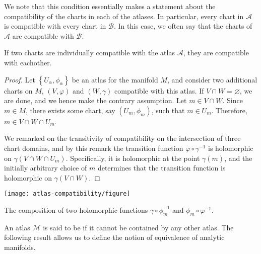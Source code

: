 We note that this condition essentially makes a statement about the
compatibility of the charts in each of the atlases. In particular, every chart
in $ \mathcal{A} $ is compatible with every chart in $ \mathcal{B} $. In this
case, we often say that the charts of $ \mathcal{A} $ are compatible with $
	\mathcal{B} $.

\begin{lemma}\label{lem:compatibility-transitivity}
	If two charts are individually compatible with the atlas $ \mathcal{A} $, they
	are compatible with eachother.
	\begin{proof}
		Let $ \left\{ U _{\alpha}, \phi _{\alpha} \right\} $ be an atlas for the
		manifold $ M $, and consider two additional charts on $ M $, $ (V, \varphi) $
		and $ (W, \gamma) $ compatible with this atlas. If $ V \cap W = \varnothing
		$, we are done, and we hence make the contrary assumption. Let $ m \in V
			\cap W $. Since $ m \in M $, there exists some chart, say $ (U_m, \phi_m) $,
		such that $ m \in U_m $. Therefore, $ m \in V \cap W \cap U_m $.

		We remarked on the transitivity of compatibility on the intersection of three
		chart domains, and by this remark the transition function $ \varphi \circ \gamma
			^{-1} $ is holomorphic on $ \gamma(V \cap W \cap U_m) $. Specifically, it is
		holomorphic at the point $ \gamma(m) $, and the initially arbitrary choice of $
			m $ determines that the transition function is holomorphic on $ \gamma(V \cap W)
		$.
	\end{proof}
\end{lemma}

\begin{marginfigure}[-15\baselineskip]
	\centering
	\texttt{[image: atlas-compatibility/figure]}
	\caption{The composition of two holomorphic functions $ \gamma \circ \phi_m
			^{-1} $ and $ \phi_m \circ \varphi ^{-1} $.}
\end{marginfigure}

An atlas $ \mathcal{M} $ is said to be  if it cannot be
contained by any other atlas. The following result allows us to define the
notion of equivalence of analytic manifolds.

